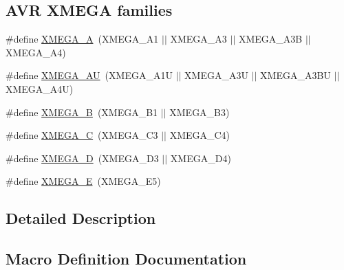 \subsection*{A\+V\+R X\+M\+E\+G\+A families}
\begin{DoxyCompactItemize}
\item 
\#define \hyperlink{group__xmega__part__macros__group_gab903a90d3a0bc99d7248eaecbb325a23}{X\+M\+E\+G\+A\+\_\+\+A}~(X\+M\+E\+G\+A\+\_\+\+A1 $\vert$$\vert$ X\+M\+E\+G\+A\+\_\+\+A3 $\vert$$\vert$ X\+M\+E\+G\+A\+\_\+\+A3\+B $\vert$$\vert$ X\+M\+E\+G\+A\+\_\+\+A4)
\item 
\#define \hyperlink{group__xmega__part__macros__group_ga55210f3805902072fce76647b50fa177}{X\+M\+E\+G\+A\+\_\+\+A\+U}~(X\+M\+E\+G\+A\+\_\+\+A1\+U $\vert$$\vert$ X\+M\+E\+G\+A\+\_\+\+A3\+U $\vert$$\vert$ X\+M\+E\+G\+A\+\_\+\+A3\+B\+U $\vert$$\vert$ X\+M\+E\+G\+A\+\_\+\+A4\+U)
\item 
\#define \hyperlink{group__xmega__part__macros__group_ga62f2c1c93640237425cb64186ddce219}{X\+M\+E\+G\+A\+\_\+\+B}~(X\+M\+E\+G\+A\+\_\+\+B1 $\vert$$\vert$ X\+M\+E\+G\+A\+\_\+\+B3)
\item 
\#define \hyperlink{group__xmega__part__macros__group_ga75b06dd59d29b1de54dd73fe67830973}{X\+M\+E\+G\+A\+\_\+\+C}~(X\+M\+E\+G\+A\+\_\+\+C3 $\vert$$\vert$ X\+M\+E\+G\+A\+\_\+\+C4)
\item 
\#define \hyperlink{group__xmega__part__macros__group_gacc9e4b074c3f87ce7b461483b0beb15c}{X\+M\+E\+G\+A\+\_\+\+D}~(X\+M\+E\+G\+A\+\_\+\+D3 $\vert$$\vert$ X\+M\+E\+G\+A\+\_\+\+D4)
\item 
\#define \hyperlink{group__xmega__part__macros__group_gaab6d2543c5128fca0b1aeecb5c080723}{X\+M\+E\+G\+A\+\_\+\+E}~(X\+M\+E\+G\+A\+\_\+\+E5)
\end{DoxyCompactItemize}


\subsection{Detailed Description}


\subsection{Macro Definition Documentation}
\hypertarget{group__xmega__part__macros__group_ga959bff90afbae437308a52eeb67b3368}{}
